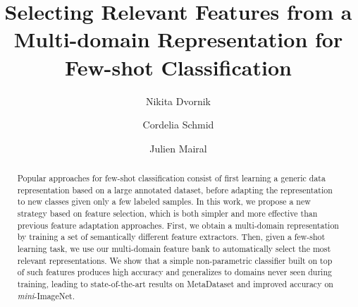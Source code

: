 \documentclass[runningheads]{llncs}
\begin{document}
\pagestyle{headings}
\mainmatter
\def\ECCVSubNumber{1267}  

\title{Selecting Relevant Features from a Multi-domain Representation for Few-shot Classification} 

\begin{comment}
\titlerunning{Selecting Relevant Features from a Multi-domain Representation} 
\authorrunning{Nikita Dvornik, Cordelia Schmid, Julien Mairal} 
\author{Nikita Dvornik, Cordelia Schmid, Julien Mairal}
\institute{Univ. Grenoble Alpes, Inria, CNRS, Grenoble INP, LJK, 38000 Grenoble, France}
\end{comment}


\author{Nikita Dvornik \and
Cordelia Schmid \and
Julien Mairal}
\maketitle

\begin{abstract}
   Popular approaches for few-shot classification consist of first learning a
generic data representation based on a large annotated dataset, before
adapting the representation to new classes given only a few labeled samples. In
this work, we propose a new strategy based on feature selection, which is both
simpler and more effective than previous feature adaptation approaches. First,
we obtain a multi-domain representation by training a set of semantically different
feature extractors. Then, given a few-shot learning task, we use our multi-domain
feature bank to automatically select the most relevant representations. We show
that a simple non-parametric classifier built on top of such features produces
high accuracy and generalizes to domains never seen during training, leading
to state-of-the-art results on MetaDataset and improved accuracy on
\textit{mini}-ImageNet.

 \end{abstract}
\end{document}

